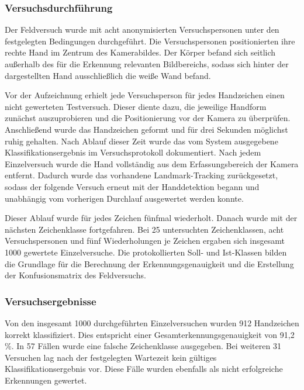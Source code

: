 \subsubsection{Versuchsdurchführung}\label{sec:versuchsdurchfuhrung}

Der Feldversuch wurde mit acht anonymisierten Versuchspersonen unter den festgelegten Bedingungen durchgeführt. Die Versuchspersonen positionierten ihre rechte Hand im Zentrum des Kamerabildes. Der Körper befand sich seitlich außerhalb des für die Erkennung relevanten Bildbereichs, sodass sich hinter der dargestellten Hand ausschließlich die weiße Wand befand.

Vor der Aufzeichnung erhielt jede Versuchsperson für jedes Handzeichen einen nicht gewerteten Testversuch. Dieser diente dazu, die jeweilige Handform zunächst auszuprobieren und die Positionierung vor der Kamera zu überprüfen. Anschließend wurde das Handzeichen geformt und für drei Sekunden möglichst ruhig gehalten. Nach Ablauf dieser Zeit wurde das vom System ausgegebene Klassifikationsergebnis im Versuchsprotokoll dokumentiert. Nach jedem Einzelversuch wurde die Hand vollständig aus dem Erfassungsbereich der Kamera entfernt. Dadurch wurde das vorhandene Landmark-Tracking zurückgesetzt, sodass der folgende Versuch erneut mit der Handdetektion begann und unabhängig vom vorherigen Durchlauf ausgewertet werden konnte.

Dieser Ablauf wurde für jedes Zeichen fünfmal wiederholt. Danach wurde mit der nächsten Zeichenklasse fortgefahren. Bei 25 untersuchten Zeichenklassen, acht Versuchspersonen und fünf Wiederholungen je Zeichen ergaben sich insgesamt 1000 gewertete Einzelversuche. Die protokollierten Soll- und Ist-Klassen bilden die Grundlage für die Berechnung der Erkennungsgenauigkeit und die Erstellung der Konfusionsmatrix des Feldversuchs.

\subsubsection{Versuchsergebnisse}\label{sec:versuchsergebnisse}

Von den insgesamt 1000 durchgeführten Einzelversuchen wurden 912 Handzeichen korrekt klassifiziert. Dies entspricht einer Gesamterkennungsgenauigkeit von 91,2\,\%. In 57 Fällen wurde eine falsche Zeichenklasse ausgegeben. Bei weiteren 31 Versuchen lag nach der festgelegten Wartezeit kein gültiges Klassifikationsergebnis vor. Diese Fälle wurden ebenfalls als nicht erfolgreiche Erkennungen gewertet.

